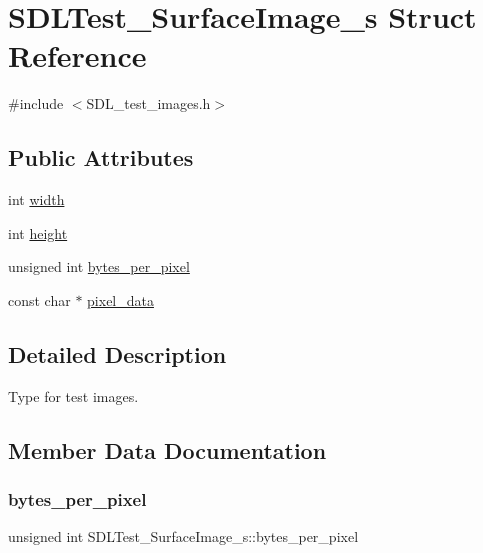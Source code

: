 \hypertarget{struct_s_d_l_test___surface_image__s}{}\section{S\+D\+L\+Test\+\_\+\+Surface\+Image\+\_\+s Struct Reference}
\label{struct_s_d_l_test___surface_image__s}


{\ttfamily \#include $<$S\+D\+L\+\_\+test\+\_\+images.\+h$>$}

\subsection*{Public Attributes}
\begin{DoxyCompactItemize}
\item 
int \hyperlink{struct_s_d_l_test___surface_image__s_a3cbacf6b015a22832ab4d3f509719609}{width}
\item 
int \hyperlink{struct_s_d_l_test___surface_image__s_a310092874695556e4b7f1f63aec24213}{height}
\item 
unsigned int \hyperlink{struct_s_d_l_test___surface_image__s_a2daf91bab3d79fb9dfa25e8ade43e606}{bytes\+\_\+per\+\_\+pixel}
\item 
const char $\ast$ \hyperlink{struct_s_d_l_test___surface_image__s_acf2d3006bea5690f564d3003d1512fa7}{pixel\+\_\+data}
\end{DoxyCompactItemize}


\subsection{Detailed Description}
Type for test images. 

\subsection{Member Data Documentation}
\mbox{\label{struct_s_d_l_test___surface_image__s_a2daf91bab3d79fb9dfa25e8ade43e606}} 
\subsubsection{\texorpdfstring{bytes\+\_\+per\+\_\+pixel}{bytes\_per\_pixel}}
{\footnotesize\ttfamily unsigned int S\+D\+L\+Test\+\_\+\+Surface\+Image\+\_\+s\+::bytes\+\_\+per\+\_\+pixel}

